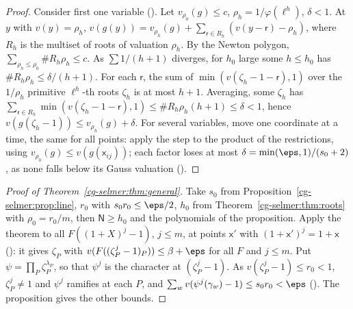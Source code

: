 \begin{proof}
Consider first one variable (). Let
$v_{\rho_0}(g)\le c$, $\rho_h=1/\varphi(\ell^h)$, $\delta<1$. At $y$ with $v(y)=\rho_h$,
$v(g(y))=v_{\rho_h}(g)+\sum_{\mathsf r\in R_h}(v(y-\mathsf r)-\rho_h)$, where $R_h$ is the multiset of roots
of valuation $\rho_h$. By the Newton polygon, $\sum_{\rho_h\le\rho_0}\#R_h\rho_h\le c$. As
$\sum1/(h+1)$ diverges, for $h_0$ large some $h\le h_0$ has $\#R_h\rho_h\le\delta/(h+1)$. For each $\mathsf r$, the
sum of $\min(v(\zeta_h-1-\mathsf r),1)$ over the $1/\rho_h$ primitive $\ell^h$-th roots $\zeta_h$ is at most
$h+1$. Averaging, some $\zeta_h$ has $\sum_{\mathsf r\in R_h}\min(v(\zeta_h-1-\mathsf r),1)\le\#R_h\rho_h(h+1)
\le\delta<1$, hence $v(g(\zeta_h-1))\le v_{\rho_h}(g)+\delta$. For several variables, move one coordinate
at a time, the same for all points: apply the step to the product of the restrictions, using
$v_{\rho_0}(g)\le v(g(\mathsf x_{ij}))$; each factor loses at most $\delta=\min(\eps,1)/(s_0+2)$, as none
falls below its Gauss valuation ().
\end{proof}

\begin{proof}[Proof of Theorem~\ref{cg-selmer:thm:general}]
Take $s_0$ from Proposition~\ref{cg-selmer:prop:line}, $r_0$ with $s_0r_0\le\eps/2$, $h_0$ from
Theorem~\ref{cg-selmer:thm:roots} with $\rho_0=r_0/m$, then $\mathsf N\ge h_0$ and the polynomials of the
proposition. Apply the theorem to all $F((1+X)^j-1)$, $j\le m$, at points $\mathsf x'$ with $(1+\mathsf x')^j=1+\mathsf x$
(): it gives $\zeta_P$ with
$v(F((\zeta_P^j-1)_P))\le\beta+\eps$ for all $F$ and $j\le m$. Put $\psi=\prod_P\zeta_P^{\lambda_P}$, so
that $\psi^j$ is the character at $(\zeta_P^j-1)$. As $v(\zeta_P^j-1)\le r_0<1$, $\zeta_P^j\ne1$ and
$\psi^j$ ramifies at each $P$, and $\sum_wv(\psi^j(\gamma_w)-1)\le s_0r_0<\eps$
(). The proposition gives the other bounds.
\end{proof}
